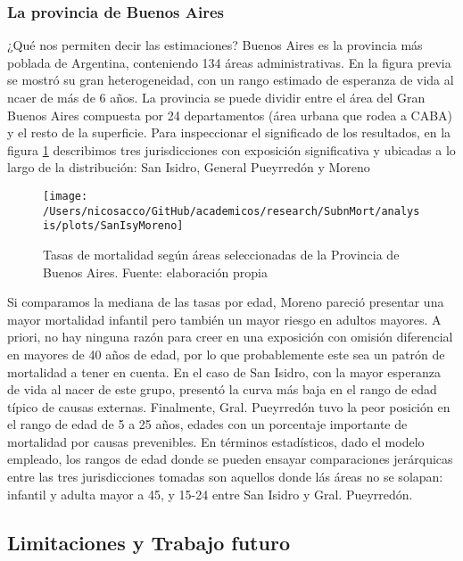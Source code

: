 \documentclass[12pt,]{article}
\begin{document}
\hypertarget{la-provincia-de-buenos-aires}{%
\subsubsection{La provincia de Buenos
Aires}\label{la-provincia-de-buenos-aires}}

¿Qué nos permiten decir las estimaciones? Buenos Aires es la provincia
más poblada de Argentina, conteniendo 134 áreas administrativas. En la
figura previa se mostró su gran heterogeneidad, con un rango estimado de
esperanza de vida al ncaer de más de 6 años. La provincia se puede
dividir entre el área del Gran Buenos Aires compuesta por 24
departamentos (área urbana que rodea a CABA) y el resto de la
superficie. Para inspeccionar el significado de los resultados, en la
figura \ref{fig:dptosBsAs} describimos tres jurisdicciones con
exposición significativa y ubicadas a lo largo de la distribución: San
Isidro, General Pueyrredón y Moreno

\begin{figure}

{\centering \texttt{[image: /Users/nicosacco/GitHub/academicos/research/SubnMort/analysis/plots/SanIsyMoreno]} 

}

\caption{Tasas de mortalidad según áreas seleccionadas de la Provincia de Buenos Aires. Fuente: elaboración propia}\label{fig:dptosBsAs}
\end{figure}

Si comparamos la mediana de las tasas por edad, Moreno pareció presentar
una mayor mortalidad infantil pero también un mayor riesgo en adultos
mayores. A priori, no hay ninguna razón para creer en una exposición con
omisión diferencial en mayores de 40 años de edad, por lo que
probablemente este sea un patrón de mortalidad a tener en cuenta. En el
caso de San Isidro, con la mayor esperanza de vida al nacer de este
grupo, presentó la curva más baja en el rango de edad típico de causas
externas. Finalmente, Gral. Pueyrredón tuvo la peor posición en el rango
de edad de 5 a 25 años, edades con un porcentaje importante de
mortalidad por causas prevenibles. En términos estadísticos, dado el
modelo empleado, los rangos de edad donde se pueden ensayar
comparaciones jerárquicas entre las tres jurisdicciones tomadas son
aquellos donde lás áreas no se solapan: infantil y adulta mayor a 45, y
15-24 entre San Isidro y Gral. Pueyrredón.

\hypertarget{limitaciones-y-trabajo-futuro}{%
\subsection{Limitaciones y Trabajo
futuro}\label{limitaciones-y-trabajo-futuro}}
\end{document}
